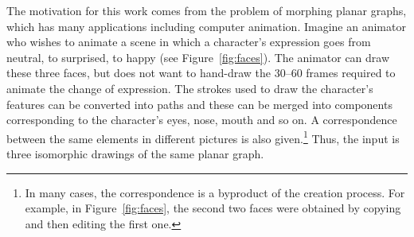 \documentclass[11pt]{patmorin}
\begin{document}
The motivation for this work comes from the
problem of morphing planar graphs, which has many applications
\cite{erten.kobourov.ea:intersection-free,friedrich.eades:graph,gotsman.surazhsky:guaranteed,surazhsky.gotsman:controllable,surazhsky.gotsman:intrinsic}
including computer animation.  Imagine an animator who wishes to animate a
scene in which a character's expression goes from neutral, to surprised,
to happy (see Figure~\ref{fig:faces}). The animator can draw these
three faces, but does not want to hand-draw the 30--60 frames required
to animate the change of expression.  The strokes used to draw the
character's features can be converted into paths and these can be merged
into components corresponding to the character's eyes, nose, mouth and
so on.  A correspondence between the same elements in different pictures
is also given.\footnote{In many cases, the correspondence is a byproduct
of the creation process. For example, in Figure~\ref{fig:faces}, the
second two faces were obtained by copying and then editing the first one.}
Thus, the input is three isomorphic drawings of the same planar graph.
\end{document}
